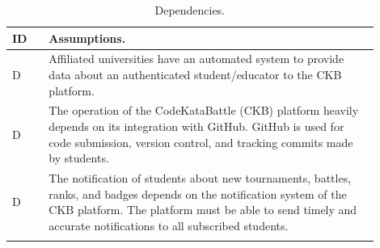 \setcounter{dc}{0}
\newcommand{\cd}{\stepcounter{dc}\theac}

\newcommand{\dcrow}[1]{
    C\cd & #1 \\
    \hline
}

\begin{center}
    \begin{longtable}{ |l|p{0.9\linewidth}| }
        \hline
        \textbf{ID} & \textbf{Assumptions}.                                   \\
        \hline
        D\cd        & Affiliated universities have an automated system to provide data about an authenticated student/educator to the CKB platform.                                  \\
        \hline
        D\cd        &  The operation of the CodeKataBattle (CKB) platform heavily depends on its integration with GitHub. 
        GitHub is used for code submission, version control, and tracking commits made by students. \\
        \hline
        D\cd        & The notification of students about new tournaments, battles, ranks, and badges depends on the notification system of the CKB platform. 
        The platform must be able to send timely and accurate notifications to all subscribed students.                                                             \\
        \hline
        \caption{Dependencies.}
        \label{tab:dependencies_tab}%
    \end{longtable}
\end{center}